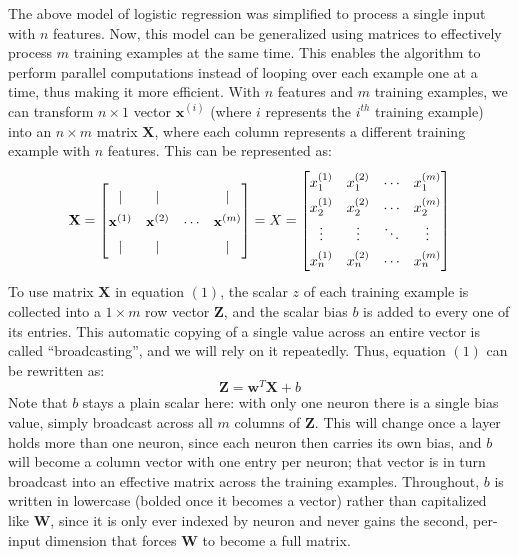 \documentclass{article}
\begin{document}
The above model of logistic regression was simplified to process a single input with $n$ features. Now, this model can be generalized using matrices to effectively process $m$ training examples at the same time. This enables the algorithm to perform parallel computations instead of looping over each example one at a time, thus making it more efficient. With $n$ features and $m$ training examples, we can transform $n \times 1$ vector $\mathbf{x}^{(i)}$ (where $i$ represents the $i^{th}$ training example) into an $n \times m$ matrix $\mathbf{X}$, where each column represents a different training example with $n$ features. This can be represented as:
\begin{equation}
    \mathbf{X} = \begin{bmatrix}
\vert & \vert & & \vert \\
\mathbf{x}^{(1)} & \mathbf{x}^{(2)} & \cdots & \mathbf{x}^{(m)} \\
\vert & \vert & & \vert
\end{bmatrix} = \renewcommand{\arraystretch}{1.5}
X = \begin{bmatrix}
x^{(1)}_1 & x^{(2)}_1 & \cdots & x^{(m)}_1 \\
x^{(1)}_2 & x^{(2)}_2 & \cdots & x^{(m)}_2 \\
\vdots & \vdots & \ddots & \vdots \\
x^{(1)}_n & x^{(2)}_n & \cdots & x^{(m)}_n
\end{bmatrix}
\end{equation}
To use matrix $\mathbf{X}$ in equation $(1)$, the scalar $z$ of each training example is collected into a $1 \times m$ row vector $\mathbf{Z}$, and the scalar bias $b$ is added to every one of its entries. This automatic copying of a single value across an entire vector is called ``broadcasting'', and we will rely on it repeatedly. Thus, equation $(1)$ can be rewritten as:
\begin{equation}
    \mathbf{Z} = \mathbf{w}^T\mathbf{X} + b
\end{equation}
Note that $b$ stays a plain scalar here: with only one neuron there is a single bias value, simply broadcast across all $m$ columns of $\mathbf{Z}$. This will change once a layer holds more than one neuron, since each neuron then carries its own bias, and $b$ will become a column vector with one entry per neuron; that vector is in turn broadcast into an effective matrix across the training examples. Throughout, $b$ is written in lowercase (bolded once it becomes a vector) rather than capitalized like $\mathbf{W}$, since it is only ever indexed by neuron and never gains the second, per-input dimension that forces $\mathbf{W}$ to become a full matrix.
\end{document}
